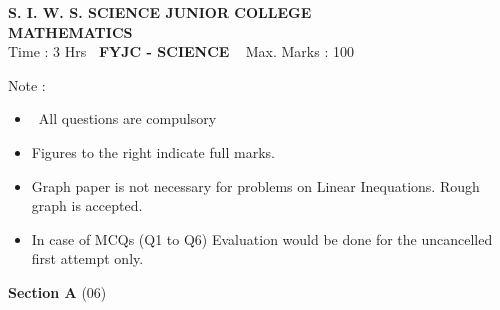 \documentclass[16pt,a4paper]{article}
\begin{document}
\begin{center}
\textbf {S. I. W. S. SCIENCE JUNIOR COLLEGE } \\
\textbf{MATHEMATICS} \\

Time : 3 Hrs \hspace {3.6cm} \textbf {\ FYJC - SCIENCE}  \hspace{2.9cm} Max. Marks : 100

\end{center}

Note :

\begin {itemize}
\item  All questions are compulsory 

\item Figures to the right indicate full marks.
\item Graph paper is not necessary for problems on Linear Inequations. Rough graph is accepted.

\item In case of MCQs (Q1 to Q6) Evaluation would be done for the uncancelled first attempt only. 

\end{itemize}


\begin{center}
\hfill \textbf{Section A} \tabto{17.9cm}(06)
\end{center}

\end{document}
